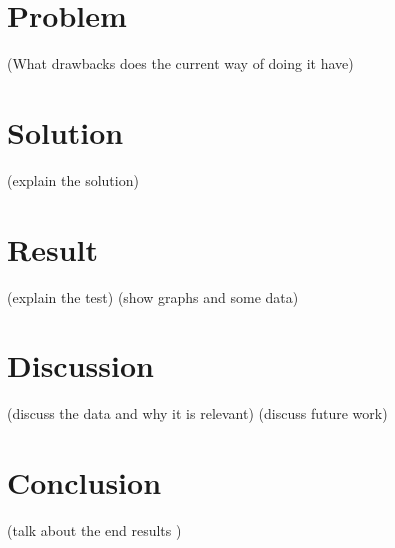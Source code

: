\documentclass{acmsiggraph}
\begin{document}
\section{Problem}
(What drawbacks does the current way of doing it have)

\section{Solution}
(explain the solution)

\section{Result}
(explain the test)
(show graphs and some data)

\section{Discussion}
(discuss the data and why it is relevant)
(discuss future work)

\section{Conclusion}
(talk about the end results )


\nocite{*}

\end{document}
